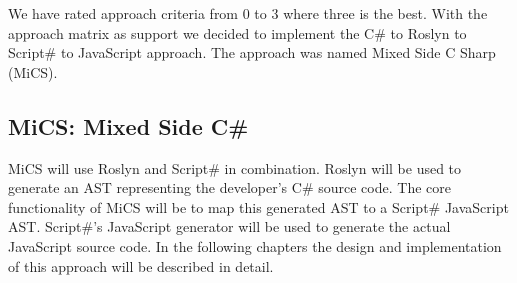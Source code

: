 	We have rated approach criteria from 0 to 3 where three is the best. With the approach matrix as support we decided to implement the C\# to Roslyn to Script\# to JavaScript approach. The approach was named Mixed Side C Sharp (MiCS).

	\FloatBarrier

	\subsection{MiCS: Mixed Side C\#} %
	\label{sub:mics_mixed_side_csharp}
	MiCS will use Roslyn and Script\# in combination. Roslyn will be used to generate an AST representing the developer's C\# source code. The core functionality of MiCS will be to map this generated AST to a Script\# JavaScript AST. Script\#'s JavaScript generator will be used to generate the actual JavaScript source code. In the following chapters the design and implementation of this approach will be described in detail.


